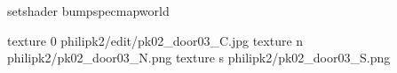 setshader bumpspecmapworld

texture 0 philipk2/edit/pk02_door03_C.jpg
texture n philipk2/pk02_door03_N.png
texture s philipk2/pk02_door03_S.png

